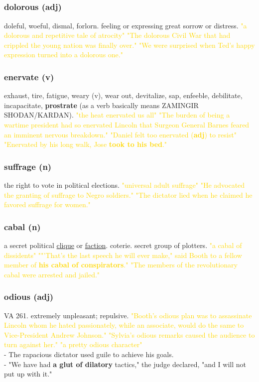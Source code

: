 \documentclass{proc}
\begin{document}
	\subsection{}
	\subsubsection{\textcolor{brickred}{dolorous} (adj)}
	doleful, woeful, dismal, forlorn. feeling or expressing great sorrow or distress.
	\textcolor{gold}{"a dolorous and repetitive tale of atrocity" "The dolorous Civil War that had crippled the young nation was finally over." "We were surprised when Ted's happy expression turned into a dolorous one."}
	
	\subsubsection{\textcolor{brickred}{enervate} (v)}
	exhaust, tire, fatigue, weary (v), wear out, devitalize, sap, enfeeble, debilitate, incapacitate, \textbf{prostrate} (as a verb basically means ZAMINGIR SHODAN/KARDAN).
	\textcolor{gold}{"the heat enervated us all" "The burden of being a wartime president had so enervated Lincoln that Surgeon General Barnes feared an imminent nervous breakdown." "Daniel felt too enervated (\textbf{adj}) to resist" "Enervated by his long walk, Jose \textbf{took to his bed}."}
	
	\subsubsection{\textcolor{brickred}{suffrage} (n)}
	the right to vote in political elections.
	\textcolor{gold}{"universal adult suffrage" "He advocated the granting of suffrage to Negro soldiers." "The dictator lied when he claimed he favored suffrage for women."}
	
	\subsubsection{\textcolor{brickred}{cabal} (n)}
	a secret political \underline{clique} or \underline{faction}. coterie. secret group of plotters.
	\textcolor{gold}{"a cabal of dissidents" ""'That's the last speech he will ever make," said Booth to a fellow member of \textbf{his cabal of conspirators}." "The members of the revolutionary cabal were arrested and jailed."}
	
	\subsubsection{\textcolor{brickred}{odious} (adj)}
	VA 261. extremely unpleasant; repulsive.
	\textcolor{gold}{"Booth's odious plan was to assassinate Lincoln whom he hated passionately, while an associate, would do the same to Vice-President Andrew Johnson." "Sylvia's odious remarks caused the audience to turn against her." "a pretty odious character"}\\
	- The rapacious dictator used guile to achieve his goals.\\
	- "We have had \textbf{a glut of dilatory} tactics," the judge declared, "and I will not put up with it."
	
\end{document}

